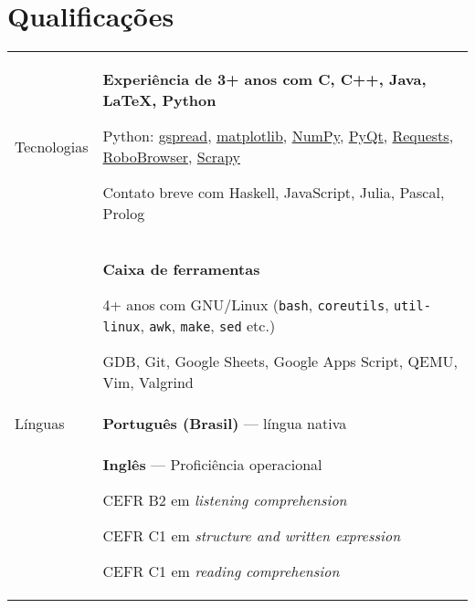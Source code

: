 \documentclass{article}
\newenvironment{contenttable}[1]
  {\section*{#1}
   \newcolumntype{L}{>{\bf \raggedleft}p{0.13\textwidth}}
   \newcolumntype{R}{p{0.82\textwidth}}
   \begin{tabular}{L!{\color{lightgray} \vrule}R}}
  {\end{tabular}}
\newenvironment{smallitem}
  {\vspace{-2mm}\itemize%
   \setlength{\parskip}{0pt}
   \setlength{\itemsep}{2pt}}
  {\vspace{-2mm}\enditemize}
\begin{document}
\begin{contenttable}{Qualificações}
  Tecnologias & \textbf{Experiência de 3+ anos com C, C++, Java,
    \LaTeX{}, Python}
  \begin{smallitem}
    \item Python: \href{https://github.com/burnash/gspread}{gspread},
      \href{http://matplotlib.org/}{matplotlib},
      \href{http://www.numpy.org/}{NumPy},
      \href{http://pyqt.sourceforge.net/Docs/PyQt5/}{PyQt},
      \href{http://docs.python-requests.org/}{Requests},
      \href{https://github.com/jmcarp/robobrowser}{RoboBrowser},
      \href{http://scrapy.org/}{Scrapy}
    \item Contato breve com Haskell, JavaScript, Julia, Pascal, Prolog
  \end{smallitem} \\

  & \textbf{Caixa de ferramentas}
  \begin{smallitem}
    \item 4+ anos com GNU/Linux (\texttt{bash}, \texttt{coreutils},
      \texttt{util-linux}, \texttt{awk}, \texttt{make}, \texttt{sed} etc.)
    \item GDB, Git, Google Sheets, Google Apps Script, QEMU, Vim, Valgrind
  \end{smallitem} \\

  Línguas & \textbf{Português (Brasil)} --- língua nativa \\
  & \textbf{Inglês} --- Proficiência operacional
  \begin{smallitem}
    \item CEFR B2 em \textit{listening comprehension}
    \item CEFR C1 em \textit{structure and written expression}
    \item CEFR C1 em \textit{reading comprehension}
  \end{smallitem}
\end{contenttable}
\end{document}
